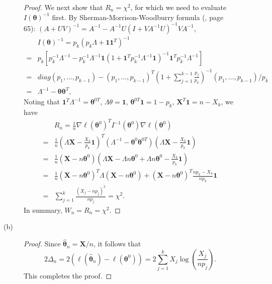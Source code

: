 \documentclass{article}
\theoremstyle{definition}
\theoremstyle{plain}
\theoremstyle{remark}
\begin{document}
\begin{description}
\begin{description}
\begin{proof}
We next show that $R_n = \chi^2$, for which we need to evaluate $I(\bm{\theta})^{-1}$ first.
By Sherman-Morrison-Woodburry formula (\cite{golub2013matrix}, page 65): $(A + UV)^{-1} = 
A^{-1} - A^{-1}U(I + VA^{-1}U)^{-1}VA^{-1}$,
\begin{align*}
    & I(\bm{\theta})^{-1} = p_k(p_k\Lambda + \bm{1}\bm{1}^T)^{-1} \\
  = & p_k\left[p_k^{-1}\Lambda^{-1} - p_k^{-1}\Lambda^{-1}\bm{1}\left(1 + \bm{1}^Tp_k^{-1}\Lambda^{-1}\bm{1}\right)^{-1}\bm{1}^Tp_k^{-1}\Lambda^{-1}\right] \\
  = & diag(p_1, \ldots, p_{k - 1}) - (p_1, \ldots, p_{k - 1})^T\left(1 + \sum_{j = 1}^{k - 1}\frac{p_j}{p_k}\right)^{-1}(p_1, \ldots, p_{k - 1})/p_k \\
  = & \Lambda^{-1} - \bm{\theta}\bm{\theta}^T, 
\end{align*}
Noting that $\bm{1}^T\Lambda^{-1} = \bm{\theta}^{0T}$, $\Lambda\theta = \bm{1}$, $\bm{\theta}^{0T}\bm{1} = 1 - p_k$, $\bm{X}^T\bm{1} = n - X_k$, we have
\begin{align*}
    & R_n = \frac{1}{n}\nabla \ell(\bm{\theta}^0)^T I^{-1}(\bm{\theta}^0)\nabla 
    \ell(\bm{\theta}^0) \\
  = & \frac{1}{n}\left(\Lambda\bm{X} - \frac{X_k}{p_k}\bm{1}\right)^T(\Lambda^{-1} - \bm{\theta}^0\bm{\theta}^{0T})\left(\Lambda\bm{X} - \frac{X_k}{p_k}\bm{1}\right) \\
  = & \frac{1}{n}(\bm{X} - n\bm{\theta}^0)\left(\Lambda\bm{X} - \Lambda n\bm{\theta}^0 + \Lambda n\bm{\theta}^0 - \frac{X_k}{p_k}\bm{1}\right) \\
  = & \frac{1}{n}(\bm{X} - n\bm{\theta}^0)^{T}\Lambda(\bm{X} - n\bm{\theta}^0) + (\bm{X} - n\bm{\theta}^0)^T\frac{np_k - X_k}{np_k}\bm{1} \\
  = & \sum_{j = 1}^k \frac{(X_j - np_j)^2}{np_j} = \chi^2.
\end{align*}
In summary, $W_n = R_n = \chi^2$. 
\end{proof}

\item[(b)]
\begin{proof}
Since $\hat{\bm{\theta}}_n = \bm{X}/n$, it follows that 
$$2\Delta_n = 2(\ell(\hat{\bm{\theta}}_n) - \ell(\bm{\theta}^0)) = 
2\sum_{j = 1}^k X_j\log\left(\frac{X_j}{np_j}\right).$$
This completes the proof.
\end{proof}
\end{description}


\end{description}
\end{document}
